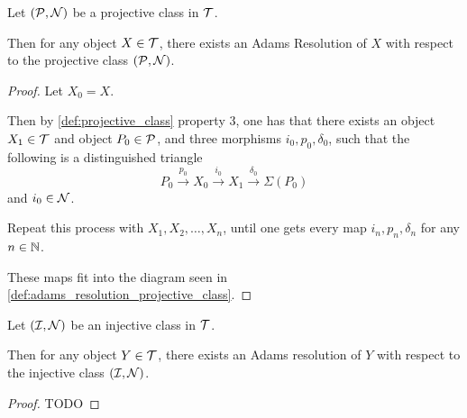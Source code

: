\begin{theorem} %
    Let \( ({\mathcal{P}}, {\mathcal{N}}) \) be a projective class in \( {\mathcal{T}} \).

    Then for any object \( X \in {\mathcal{T}} \), there exists an Adams Resolution of \( X \) with respect to the projective class \( ({\mathcal{P}}, {\mathcal{N}}) \).
\end{theorem}
\begin{proof}
    Let \( X_0 = X \).

    Then by \autoref{def:projective_class} property 3, one has that there exists an object \( X_1 \in {\mathcal{T}} \) and object \( P_0 \in {\mathcal{P}} \), and three morphisms \( i_0, p_0, \delta_0 \), such that the following is a distinguished triangle
    \[
        P_0 \stackrel{p_0}{\longrightarrow} X_0 \stackrel{i_0}{\longrightarrow} X_1 \stackrel{\delta_0}{\longrightarrow} \Sigma(P_0)
    \]
    and \( i_0 \in {\mathcal{N}} \).

    Repeat this process with \( X_1, X_2, \dots, X_n \), until one gets every map \( i_n, p_n, \delta_n \) for any \( n \in {\mathbb{N}} \).

    These maps fit into the diagram seen in \autoref{def:adams_resolution_projective_class}.
\end{proof}

\begin{theorem} \label{thm:exists_adams_resolution_injective_class} %
    Let \( ({\mathcal{I}}, {\mathcal{N}}) \) be an injective class in \( {\mathcal{T}} \).

    Then for any object \( Y \in {\mathcal{T}} \), there exists an Adams resolution of \( Y \) with respect to the injective class \( ({\mathcal{I}}, {\mathcal{N}}) \).
\end{theorem}
\begin{proof}
    TODO
\end{proof}

